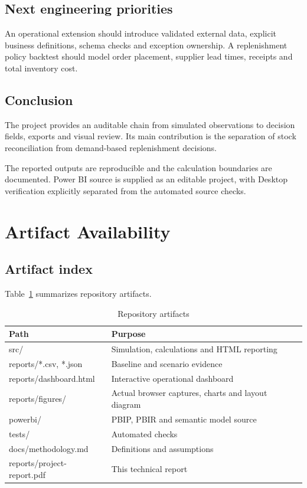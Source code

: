 \documentclass[conference,letterpaper]{IEEEtran}
\begin{document}
\subsection{Next engineering priorities}

An operational extension should introduce validated external data, explicit business definitions, schema checks and exception ownership. A replenishment policy backtest should model order placement, supplier lead times, receipts and total inventory cost.


\subsection{Conclusion}

The project provides an auditable chain from simulated observations to decision fields, exports and visual review. Its main contribution is the separation of stock reconciliation from demand-based replenishment decisions.


The reported outputs are reproducible and the calculation boundaries are documented. Power BI source is supplied as an editable project, with Desktop verification explicitly separated from the automated source checks.


\section{Artifact Availability}

\subsection{Artifact index}

Table~\ref{tab:7} summarizes repository artifacts.

\begin{table}[H]
\caption{Repository artifacts}\label{tab:7}
\centering\footnotesize
\setlength{\tabcolsep}{3pt}
\begin{tabularx}{\columnwidth}{>{\raggedright\arraybackslash}X >{\raggedright\arraybackslash}X}
\hline
\textbf{Path} & \textbf{Purpose} \\
\hline
src/ & Simulation, calculations and HTML reporting \\
reports/*.csv, *.json & Baseline and scenario evidence \\
reports/dashboard.html & Interactive operational dashboard \\
reports/figures/ & Actual browser captures, charts and layout diagram \\
powerbi/ & PBIP, PBIR and semantic model source \\
tests/ & Automated checks \\
docs/methodology.md & Definitions and assumptions \\
reports/project-report.pdf & This technical report \\
\hline
\end{tabularx}
\end{table}
\end{document}
